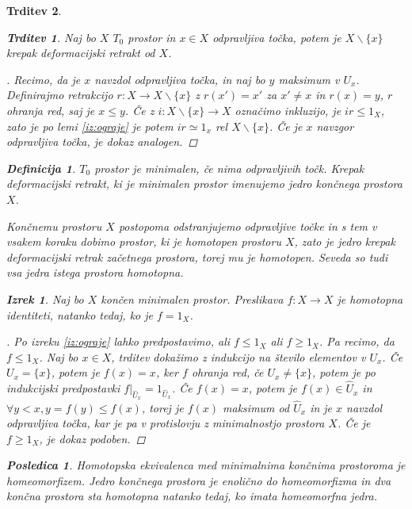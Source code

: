 \documentclass[a4paper,12pt]{article}
\theoremstyle{definition}
\newtheorem{definicija}{Definicija}
\theoremstyle{plain}
\newtheorem{izrek}{Izrek}
\theoremstyle{definition}
\theoremstyle{plain}
\newtheorem{trditev}{Trditev}
\theoremstyle{plain}
\newtheorem{posledica}{Posledica}
\theoremstyle{plain}
\theoremstyle{plain}
\newenvironment{dokaz}{\begin{proof}[\bfseries\upshape\proofname]}{\end{proof}}
\begin{document}
\begin{trditev}
\begin{trditev}
Naj bo $X$ $T_0$ prostor in $x\in X$ odpravljiva točka, potem je $X\backslash \{x\}$ krepak deformacijski retrakt od $X$.
\end{trditev}

\begin{dokaz}
Recimo, da je $x$ navzdol odpravljiva točka, in naj bo $y$ 
maksimum v $U_x$. Definirajmo retrakcijo $r:X\rightarrow 
X\backslash \{x\}$ z $r(x')=x'$ za $x'\neq x$ in $r(x)=y$, 
$r$ ohranja red, saj je $x\leq y$. Če z $i:X\backslash\{x\} 
\rightarrow X$ označimo inkluzijo, je $ir\leq 1_X$, zato je 
po lemi \ref{iz:ograje} je potem $ir \simeq 1_x$ rel 
$X\backslash\{x\}$. Če je $x$ navzgor odpravljiva točka, je 
dokaz analogen.
\end{dokaz}

\begin{definicija}
    $T_0$ prostor je \textit{minimalen}, če nima odpravljivih točk. Krepak deformacijski retrakt, ki je minimalen prostor imenujemo \textit{jedro} končnega prostora $X$.
\end{definicija}

Končnemu prostoru $X$ postopoma odstranjujemo odpravljive točke in s tem v vsakem koraku dobimo prostor, ki je homotopen prostoru $X$, zato je jedro krepak deformacijski retrak začetnega prostora, torej mu je homotopen. Seveda so tudi vsa jedra istega prostora homotopna.

\begin{izrek}
    \label{iz:identiteta}
    Naj bo $X$ končen minimalen prostor. Preslikava $f:X\rightarrow X$ je homotopna identiteti, natanko tedaj, ko je $f=1_X$.
\end{izrek}

\begin{dokaz}
    Po izreku \ref{iz:ograje} lahko predpostavimo, ali 
    $f\leq 1_X$ ali $f\geq 1_X$. %
    Pa recimo, da $f\leq 1_X$. 
    Naj bo $x\in X$, trditev dokažimo z indukcijo na 
    število elementov v $U_x$. Če $U_x=\{x\}$, potem je 
    $f(x)=x$, ker $f$ ohranja red, če $U_x\neq\{x\}$, potem 
    je po indukcijski predpostavki 
    $f|_{\hat{U}_x}=1_{\hat{U}_x}$. Če $f(x)=x$, potem je 
    $f(x)\in \hat{U}_x$ in $\forall y < x, y=f(y)\leq 
    f(x)$, torej je $f(x)$ maksimum od $\hat{U}_x$ in je 
    $x$ navzdol odpravljiva točka, kar je pa v protislovju 
    z minimalnostjo prostora $X$. Če je $f\geq 1_X$, je 
    dokaz podoben.
\end{dokaz}

\begin{posledica}
    Homotopska ekvivalenca med minimalnima končnima prostoroma je homeomorfizem. Jedro končnega prostora je enolično do homeomorfizma in dva končna prostora sta homotopna natanko tedaj, ko imata homeomorfna jedra.
\end{posledica}


\end{trditev}
\end{document}
